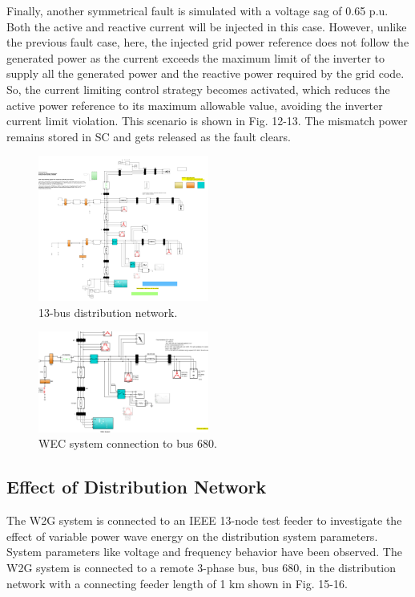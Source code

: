 \documentclass[conference]{IEEEtran}
\begin{document}
Finally, another symmetrical fault is simulated with a voltage sag of 0.65 p.u. Both the active and reactive current will be injected in this case. However, unlike the previous fault case, here, the injected grid power reference does not follow the generated power as the current exceeds the maximum limit of the inverter to supply all the generated power and the reactive power required by the grid code. So, the current limiting control strategy becomes activated, which reduces the active power reference to its maximum allowable value, avoiding the inverter current limit violation. This scenario is shown in Fig. 12-13. The mismatch power remains stored in SC and gets released as the fault clears.
\begin{figure}[htbp]
    \centering
    \includegraphics[width=0.5\textwidth]{Figs/5_3_1/13 bus.png}
    \caption{13-bus distribution network.}
    \label{fig:W2G_normal_grid}
\end{figure}
\begin{figure}[h!]
    \centering
    \includegraphics[width=0.5\textwidth]{Figs/5_3_1/wec connection 13 bus.png}
    \caption{WEC system connection to bus 680.}
    \label{fig:W2G_normal_grid}
\end{figure}


\subsection{Effect of Distribution Network}
The W2G system is connected to an IEEE 13-node test feeder to investigate the effect of variable power wave energy on the distribution system parameters. System parameters like voltage and frequency behavior have been observed. The W2G system is connected to a remote 3-phase bus, bus 680, in the distribution network with a connecting feeder length of 1 km shown in Fig. 15-16.
\end{document}
